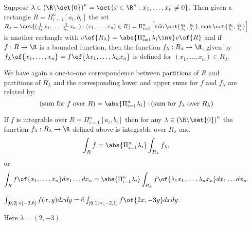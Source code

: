 Suppose $\lambda \in \left(\R \backslash \set{0}\right)^n = \set{x \in \R^n: x_1, \dots, x_n \neq 0}$. Then given a rectangle $R = \Pi_{i=1}^n [a_i,b_i]$ the set $R_\lambda = \set{(\frac{1}{\lambda_1}x_1,\dots,\frac{1}{\lambda_n}x_n,): (x_1, \dots, x_n) \in R} = \Pi_{i=1}^n \left[\min \set{\frac{a_i}{\lambda_i}, \frac{b_i}{\lambda_i}}, \max \set{\frac{a_i}{\lambda_i}, \frac{b_i}{\lambda_i}}\right]$ is another rectangle with $v\of{R_\lambda} = \abs{\Pi_{i=1}^n \lambda_i\inv}v\of{R}$ and if $f: R \to \R$ is a bounded function, then the function $f_\lambda: R_\lambda \to \R$, given by $f_\lambda\of{x_1, \dots, x_n} = f\of{\lambda x_1, \dots, \lambda_n x_n}$ is defined for $(x_1, \dots, x_n) \in R_\lambda$.

We have again a one-to-one correspondence between partitions of $R$ and partitions of $R_\lambda$ and the corresponding lower and upper sums for $f$ and $f_\lambda$ are related by:
\[\text{(sum for $f$ over $R$)} = \abs{\Pi_{i=1}^n \lambda_i} \cdot \text{(sum for $f_\lambda$ over $R_\lambda$)}\]

\begin{theorem}
    If $f$ is integrable over $R = \Pi_{i=1}^n [a_i,b_i]$ then for any $\lambda \in \left(\R \backslash \set{0}\right)^n$ the function $f_\lambda: R_\lambda \to \R$ defined above is integrable over $R_\lambda$ and \[\int_R f = \abs{\Pi_{i=1}^n \lambda_i} \int_{R_\lambda} f_\lambda,\]
    or \[\int_R f\of{x_1, \dots, x_n} dx_1 \dots dx_n = \abs{\Pi_{i=1}^n \lambda_i} \int_{R_\lambda} f\of{\lambda_1 x_1, \dots, \lambda_n x_n} dx_1 \dots dx_n.\]
\end{theorem}

\begin{example}
    $\int_{[0,2] \times [-3,6]} f(x,y) dxdy = 6 \int_{[0,1] \times [-2,1]} f\of{2x,-3y} dxdy$.

    Here $\lambda = (2, -3)$.
\end{example}